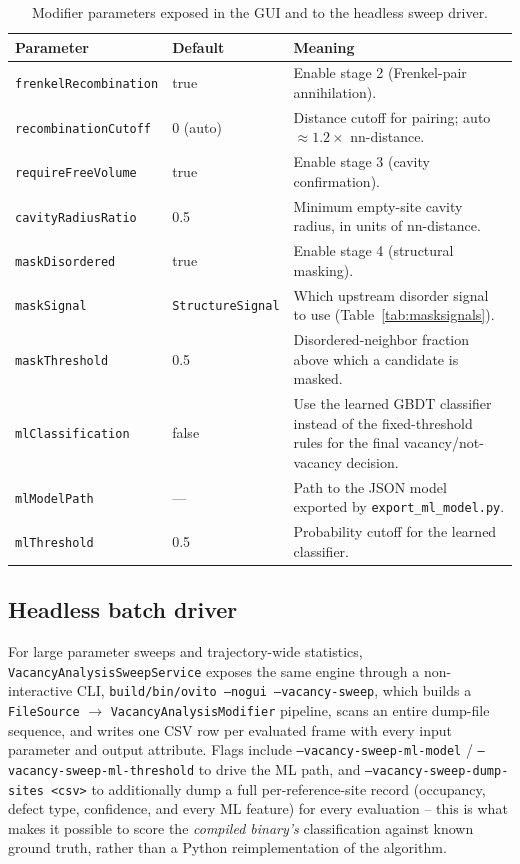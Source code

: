 \documentclass[11pt]{article}
\newcommand{\code}[1]{\texttt{#1}}
\newcommand{\attr}[1]{\texttt{#1}}
\begin{document}
\begin{table}[h]
\centering
\caption{Modifier parameters exposed in the GUI and to the headless sweep driver.}
\label{tab:params}
\begin{tabular}{@{}llp{7cm}@{}}
\toprule
Parameter & Default & Meaning \\
\midrule
\code{frenkelRecombination} & true & Enable stage 2 (Frenkel-pair annihilation). \\
\code{recombinationCutoff} & 0 (auto) & Distance cutoff for pairing; auto $\approx 1.2\times$ nn-distance. \\
\code{requireFreeVolume} & true & Enable stage 3 (cavity confirmation). \\
\code{cavityRadiusRatio} & 0.5 & Minimum empty-site cavity radius, in units of nn-distance. \\
\code{maskDisordered} & true & Enable stage 4 (structural masking). \\
\code{maskSignal} & \attr{StructureSignal} & Which upstream disorder signal to use (Table~\ref{tab:masksignals}). \\
\code{maskThreshold} & 0.5 & Disordered-neighbor fraction above which a candidate is masked. \\
\code{mlClassification} & false & Use the learned GBDT classifier instead of the fixed-threshold rules for the final vacancy/not-vacancy decision. \\
\code{mlModelPath} & --- & Path to the JSON model exported by \code{export\_ml\_model.py}. \\
\code{mlThreshold} & 0.5 & Probability cutoff for the learned classifier. \\
\bottomrule
\end{tabular}
\end{table}

\subsection{Headless batch driver}

For large parameter sweeps and trajectory-wide statistics, \code{VacancyAnalysisSweepService}
exposes the same engine through a non-interactive CLI, \code{build/bin/ovito --nogui
--vacancy-sweep}, which builds a \code{FileSource} $\to$ \code{VacancyAnalysisModifier} pipeline,
scans an entire dump-file sequence, and writes one CSV row per evaluated frame with every input
parameter and output attribute. Flags include \code{--vacancy-sweep-ml-model} /
\code{--vacancy-sweep-ml-threshold} to drive the ML path, and
\code{--vacancy-sweep-dump-sites <csv>} to additionally dump a full per-reference-site record
(occupancy, defect type, confidence, and every ML feature) for every evaluation -- this is what
makes it possible to score the \emph{compiled binary's} classification against known ground truth,
rather than a Python reimplementation of the algorithm.
\end{document}
